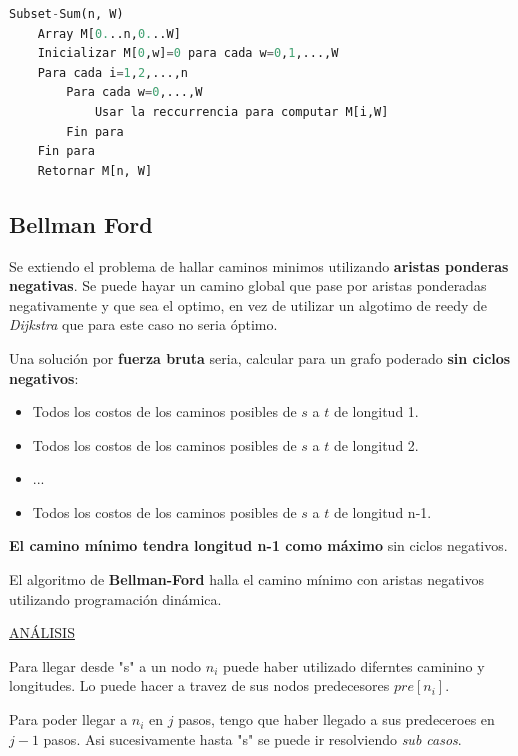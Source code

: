 \documentclass{article}
\begin{document}
\begin{lstlisting}[language=Python, caption=Algoritmo de requeridos con cupos]
Subset-Sum(n, W)
    Array M[0...n,0...W]
    Inicializar M[0,w]=0 para cada w=0,1,...,W
    Para cada i=1,2,...,n
        Para cada w=0,...,W
            Usar la reccurrencia para computar M[i,W]
        Fin para
    Fin para
    Retornar M[n, W]
\end{lstlisting}





\newpage
\subsection{Bellman Ford}

Se extiendo el problema de hallar caminos minimos utilizando \textbf{aristas ponderas negativas}. 
Se puede hayar un camino global que pase por aristas ponderadas negativamente y que sea el optimo, 
en vez de utilizar un algotimo de reedy de \textit{Dijkstra} que para este caso no seria óptimo.

Una solución por \textbf{fuerza bruta} seria, calcular para un grafo poderado \textbf{sin ciclos negativos}:

\begin{itemize}
    \item Todos los costos de los caminos posibles de \(s\) a \(t\) de longitud 1.
    \item Todos los costos de los caminos posibles de \(s\) a \(t\) de longitud 2.
    \item ...
    \item Todos los costos de los caminos posibles de \(s\) a \(t\) de longitud n-1.
\end{itemize}

\textbf{El camino mínimo tendra longitud n-1 como máximo} sin ciclos negativos.

El algoritmo de \textbf{Bellman-Ford} halla el camino mínimo con aristas negativos utilizando programación dinámica.

\underline{ANÁLISIS}

Para llegar desde "s" a un nodo \(n_i\) puede haber utilizado diferntes caminino y longitudes.
Lo puede hacer a travez de sus nodos predecesores \(pre[n_i]\).

Para poder llegar a \(n_i\) en \(j\) pasos, tengo que haber llegado a sus predeceroes en \(j-1\) pasos. 
Asi sucesivamente hasta "s" se puede ir resolviendo \textit{sub casos}.
\end{document}

